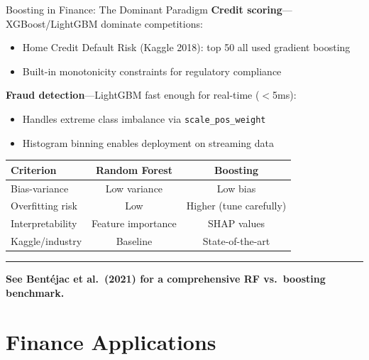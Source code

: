 \documentclass[8pt,aspectratio=169]{beamer}
\newcommand{\bottomnote}[1]{%
\vfill
\vspace{-2mm}
\textcolor{mllavender2}{\rule{\textwidth}{0.4pt}}
\vspace{1mm}
\footnotesize
\textbf{#1}
}
\begin{document}
\begin{frame}[t]{Boosting in Finance: The Dominant Paradigm}
\textbf{Credit scoring}---XGBoost/LightGBM dominate competitions:
\begin{itemize}
\item Home Credit Default Risk (Kaggle 2018): top 50 all used gradient boosting
\item Built-in monotonicity constraints for regulatory compliance
\end{itemize}

\vspace{0.3em}
\textbf{Fraud detection}---LightGBM fast enough for real-time ($<$5ms):
\begin{itemize}
\item Handles extreme class imbalance via \texttt{scale\_pos\_weight}
\item Histogram binning enables deployment on streaming data
\end{itemize}

\vspace{0.3em}
\begin{center}
\small
\begin{tabular}{lcc}
\toprule
\textbf{Criterion} & \textbf{Random Forest} & \textbf{Boosting} \\
\midrule
Bias-variance & Low variance & Low bias \\
Overfitting risk & Low & Higher (tune carefully) \\
Interpretability & Feature importance & SHAP values \\
Kaggle/industry & Baseline & State-of-the-art \\
\bottomrule
\end{tabular}
\end{center}
\bottomnote{See Bent\'ejac et al.\ (2021) for a comprehensive RF vs.\ boosting benchmark.}
\end{frame}

\section{Finance Applications}
\end{document}
